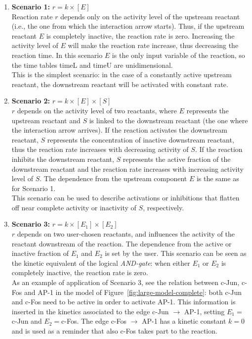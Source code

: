 \begin{enumerate}
  \item {\bf Scenario 1:} $r = k \times [E]$\\ Reaction rate $r$ depends only on the activity level of the upstream reactant (i.e., the one from which
the interaction arrow starts). Thus, if the upstream reactant $E$ is completely inactive, the reaction rate is zero.
Increasing the activity level of $E$ will make the reaction rate increase, thus decreasing the reaction time.
In this scenario $E$ is the only input variable of the reaction, so the time tables {\sf timeL} and {\sf timeU} are unidimensional.\\
This is the simplest scenario: in the case of a constantly active upstream reactant, the downstream reactant will be activated
with constant rate.
  \item {\bf Scenario 2:} $r = k \times [E] \times [S]$\\ $r$ depends on the activity level of two reactants, where $E$ represents the
upstream reactant and $S$ is linked to the downstream reactant (the one where the interaction arrow arrives).
If the reaction activates the downstream reactant, $S$ represents the concentration of inactive downstream reactant, thus the reaction rate increases with decreasing activity of $S$.
If the reaction inhibits the downstream reactant, $S$ represents the active fraction of the downstream reactant and the reaction rate increases with increasing activity level of $S$.
The dependence from the upstream component $E$ is the same as for Scenario 1.\\
This scenario can be used to describe activations or inhibitions that flatten off near complete activity or inactivity of $S$, respectively. %
  \item {\bf Scenario 3:} $r = k \times [E_1] \times [E_2]$\\ $r$ depends on two user-chosen reactants, and influences the activity of
the reactant downstream of the reaction. The dependence from the active or inactive
fraction of $E_1$ and $E_2$ is set by the user. This scenario can be seen as the kinetic equivalent of the logical \emph{AND-gate}:
when either $E_1$ or $E_2$ is completely inactive, the reaction rate is zero.\\
As an example of application of Scenario 3, see the relation between {\sf c-Jun}, {\sf c-Fos} and {\sf AP-1} in the model of Figure~\ref{fig:large-model-complete}:
both {\sf c-Jun} and {\sf c-Fos} need to be active in order to activate {\sf AP-1}. This information is inserted in the kinetics associated to the edge
{\sf c-Jun} $\rightarrow$ {\sf AP-1}, setting $E_1 = ${\sf c-Jun} and $E_2 = ${\sf c-Fos}. The edge {\sf c-Fos} $\rightarrow$ {\sf AP-1} has a kinetic
constant $k = 0$ and is used as a reminder that also {\sf c-Fos} takes part to the reaction.
\end{enumerate}



